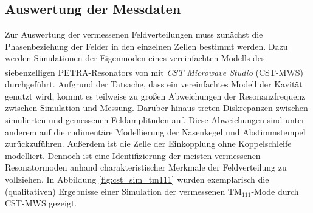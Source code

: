 \subsection{Auswertung der Messdaten}
Zur Auswertung der vermessenen Feldverteilungen muss zunächst die Phasenbeziehung der Felder in den einzelnen Zellen bestimmt werden.
Dazu werden Simulationen der Eigenmoden eines vereinfachten Modells des siebenzelligen PETRA-Resonators von \cite{schedler_pm} mit \textit{CST Microwave Studio\textsuperscript{\textregistered}} (CST-MWS) durchgeführt.
Aufgrund der Tatsache, dass ein vereinfachtes Modell der Kavität genutzt wird, kommt es teilweise zu großen Abweichungen der Resonanzfrequenz zwischen Simulation und Messung.
Darüber hinaus treten Diskrepanzen zwischen simulierten und gemessenen Feldamplituden auf.
Diese Abweichungen sind unter anderem auf die rudimentäre Modellierung der Nasenkegel und Abstimmstempel zurückzuführen.
Außerdem ist die Zelle der Einkopplung ohne Koppelschleife modelliert.
Dennoch ist eine Identifizierung der meisten vermessenen Resonatormoden anhand charakteristischer Merkmale der Feldverteilung zu vollziehen.
In Abbildung \ref{fig:cst_sim_tm111} wurden exemplarisch die (qualitativen) Ergebnisse einer Simulation der vermessenen $\mathrm{TM}_{111}$-Mode durch CST-MWS gezeigt. 
